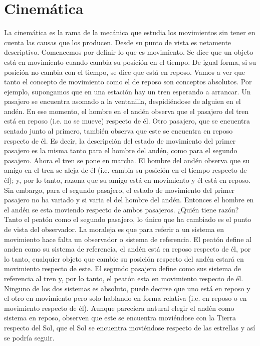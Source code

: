 \chapter{Cinemática}
La cinemática es la rama de la mecánica que estudia los movimientos sin tener en cuenta las causas que los producen. 
Desde su punto de vista es netamente descriptivo.
\para
Comencemos por definir lo que es movimiento. Se dice que un objeto está en movimiento cuando cambia su posición en el 
tiempo. De igual forma, si su posición no cambia con el tiempo, se dice que está en reposo. Vamos a ver que tanto el 
concepto de movimiento como el de reposo son conceptos absolutos. 
\para
Por ejemplo, supongamos que en una estación hay un 
tren esperando a arrancar. Un pasajero se encuentra asomado a la ventanilla, despidiéndose de alguien en el andén. En 
ese momento, el hombre en el andén observa que el pasajero del tren está en reposo (i.e. no se mueve) respecto de él. 
Otro pasajero, que se encuentra sentado junto al primero, también observa que este se encuentra en reposo respecto de 
él. Es decir, la descripción del estado de movimiento del primer pasajero es la misma tanto para el hombre del andén, 
como para el segundo pasajero. Ahora el tren se pone en marcha. El hombre del andén observa que su amigo en el tren se 
aleja de él (i.e. cambia su posición en el tiempo respecto de él); y, por lo tanto, razona que su amigo está en 
movimiento y él está en reposo. Sin embargo, para el segundo pasajero, el estado de movimiento del primer pasajero 
no ha variado y si varia el del hombre del andén. Entonces el hombre en el andén se esta moviendo respecto de ambos 
pasajeros. ¿Quién tiene razón? Tanto el peatón como el segundo pasajero, lo único que ha cambiado es el punto de vista 
del observador. La moraleja es que para referir a un sistema en movimiento hace falta un observador o sistema de 
referencia. El peatón define al anden como su sistema de referencia, el andén está en reposo respecto de él, por lo 
tanto, cualquier objeto que cambie su posición respecto del andén estará en movimiento respecto de este. El segundo 
pasajero define como sus sistema de referencia al tren y, por lo tanto, el peatón esta en movimiento respecto de él. 
Ninguno de los dos sistemas es absoluto, puede decirse que uno está en reposo y el otro en movimiento pero solo hablando 
en forma relativa (i.e. en reposo o en movimiento respecto de él). Aunque pareciera natural elegir el andén como sistema 
en reposo, observen que este se encuentra moviéndose con la Tierra respecto del Sol, que el Sol se encuentra moviéndose 
respecto de las estrellas y así se podría seguir. 

